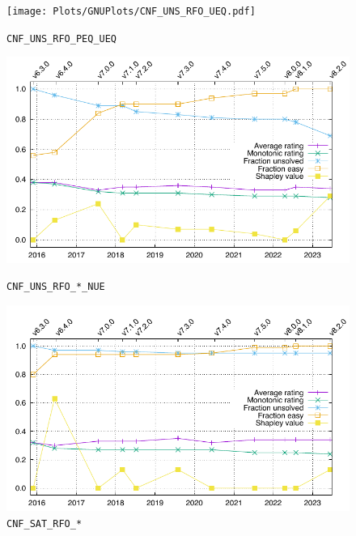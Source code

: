 \documentclass[runningheads]{llncs}
\begin{document}
\begin{figure}[h!]
\centering
\begin{minipage}[t]{.49\textwidth}
  \centering
  \texttt{[image: Plots/GNUPlots/CNF\_UNS\_RFO\_UEQ.pdf]}
  \vspace*{-2em}
  \caption{{\tt CNF\_UNS\_RFO\_PEQ\_UEQ}}
  \label{Plot_CNF_UEQ}
\end{minipage}
\begin{minipage}[t]{.49\textwidth}
  \centering
  \includegraphics[width=\textwidth]{Plots/GNUPlots/CNF_UNS_RFO_NUE.pdf}
  \vspace*{-2em}
  \caption{{\tt CNF\_UNS\_RFO\_*\_NUE}}
  \label{Plot_CNF_UNS}
\end{minipage}
\begin{minipage}[t]{.49\textwidth}
  \centering
  \includegraphics[width=\textwidth]{Plots/GNUPlots/CNF_SAT_RFO.pdf}
  \vspace*{-2em}
  \caption{{\tt CNF\_SAT\_RFO\_*}}
  \label{Plot_CNF_SAT}
\end{minipage}
\begin{minipage}[t]{.49\textwidth}

\end{minipage}
\end{figure}
\end{document}
